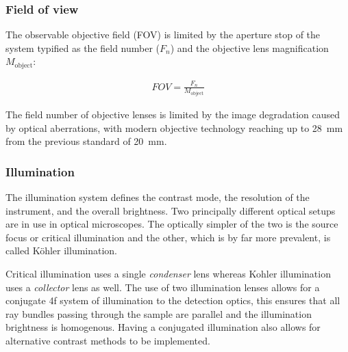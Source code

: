 




\subsubsection{Field of view}

The observable objective field (FOV) is limited by the aperture stop of the system typified as the field number ($F_n $) and the objective lens magnification $M_{\text{object}}$:

\begin{align}
FOV = \frac{F_{n}}{M_{\text{object}}}
\end{align}

The field number of objective lenses is limited by the image degradation caused by optical aberrations, with modern objective technology reaching up to \SI{28}{\milli\meter} from the previous standard of \SI{20}{\milli\meter}.

\subsubsection{Illumination}

The illumination system defines the contrast mode, the resolution of the instrument, and the overall brightness.
Two principally different optical setups are in use in optical microscopes.
The optically simpler of the two is the source focus or critical illumination and the other, which is by far more prevalent, is called Köhler illumination.

Critical illumination uses a single \emph{condenser} lens whereas Kohler illumination uses a \emph{collector} lens as well.
The use of two illumination lenses allows for a conjugate 4f system of illumination to the detection optics, this ensures that all ray bundles passing through the sample are parallel and the illumination brightness is homogenous.
Having a conjugated illumination also allows for alternative contrast methods to be implemented. %


